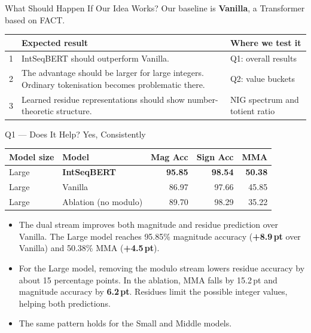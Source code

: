 \documentclass[aspectratio=169,10pt]{beamer}
\newcommand{\tightlist}{\setlength{\itemsep}{0.2em}}
\newcommand{\readout}[1]{\textcolor{readoutblue}{{\mdseries #1}}}
\begin{document}
\begin{frame}{What Should Happen If Our Idea Works?}
\small
  \readout{Our baseline is \textbf{Vanilla}, a Transformer based on FACT.}
  \par\medskip
  {\setlength{\tabcolsep}{6pt}\renewcommand{\arraystretch}{1.6}
  \begin{tabular}{@{}r
    >{\raggedright\arraybackslash}p{}
    >{\raggedright\arraybackslash}p{}@{}}
    \toprule
    & \textbf{Expected result} & \textbf{Where we test it} \\
    \midrule
    \alert{1} & \readout{IntSeqBERT should outperform Vanilla.}
      & Q1: overall results \\
    \alert{2} & \readout{The advantage should be larger for large integers.}\newline
      Ordinary tokenisation becomes problematic there.
      & Q2: value buckets \\
    \alert{3} & \readout{Learned residue representations should show number-theoretic structure.}
      & NIG spectrum and totient ratio \\
    \bottomrule
  \end{tabular}}
\end{frame}

\begin{frame}{Q1 --- Does It Help? Yes, Consistently}
  \small
  \setlength{\parskip}{0pt}
\begin{center}\small
    \begin{tabular}{llrrr}
      \toprule
      Model size & Model & Mag Acc & Sign Acc & MMA \\
      \midrule
      Large & \textbf{IntSeqBERT} & \textbf{95.85} & \textbf{98.54} & \textbf{50.38} \\
      Large & Vanilla             & 86.97          & 97.66          & 45.85 \\
      Large & Ablation (no modulo)& 89.70          & 98.29          & 35.22 \\
      \bottomrule
    \end{tabular}
  \end{center}

  \begin{itemize}\tightlist
    \item \readout{The dual stream improves both magnitude and residue prediction over Vanilla.}
          The Large model reaches \alert{95.85\%} magnitude accuracy (\textbf{+8.9\,pt} over Vanilla)
          and \alert{50.38\%} MMA (\textbf{+4.5\,pt}).
    \item \readout{For the Large model, removing the modulo stream lowers residue accuracy by about 15 percentage points.}
          In the ablation, MMA falls by \alert{15.2\,pt} and magnitude accuracy by \textbf{6.2\,pt}.
          Residues limit the possible integer values, helping both predictions.
    \item \readout{The same pattern holds for the Small and Middle models.}
  \end{itemize}
\end{frame}
\end{document}
